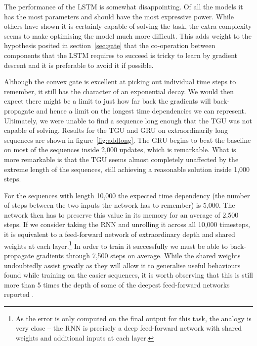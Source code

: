 The performance of the LSTM is somewhat disappointing. Of all the models it has the most parameters and 
should have the
most expressive power. While others have shown 
it is certainly capable of solving the task, the extra complexity 
seems to make optimising the model much more difficult. This adds weight to the hypothesis posited in
section~\ref{sec:gate} that the co-operation between components that the LSTM requires to succeed
is tricky to learn by gradient descent and it is preferable to avoid it if possible.

Although the convex gate is excellent at picking out individual time steps to remember, it still
has the character of an exponential decay. We would then expect there might be a limit to just how
far back the gradients will back-propagate and hence a limit on the longest time dependencies we
can represent. Ultimately, we were unable to find a sequence long enough that the TGU was not capable
of solving. Results for the TGU and GRU on extraordinarily long sequences are shown in 
figure~\ref{fig:addlong}. The GRU begins to beat the baseline on most of the
 sequences inside 2,000 updates,
which is remarkable. What is more remarkable is that the TGU seems almost completely unaffected by the
extreme length of the sequences, still achieving a reasonable solution inside 1,000 steps.

For the sequences with length 10,000 the expected time dependency (the number of steps between the
two inputs the network has to remember) is 5,000. The network then has to preserve this value in its
memory for an average of 2,500 steps. If we consider taking the RNN and unrolling it across all 10,000
timesteps, it is equivalent to a feed-forward network of extraordinary depth and shared weights at each
layer.\footnote{As the error is only computed on the final output for this task, the analogy is very
close -- the RNN is precisely a deep feed-forward network with shared weights and additional inputs
at each layer.} In order to train it successfully we must be able to back-propagate gradients through
7,500 steps on average. While the shared weights undoubtedly assist greatly as they will allow it to
generalise useful behaviours found while training on the easier sequences, it is worth observing that this
is still more than 5 times the depth of some of the deepest feed-forward networks reported
\autocite{Huang2016}.


